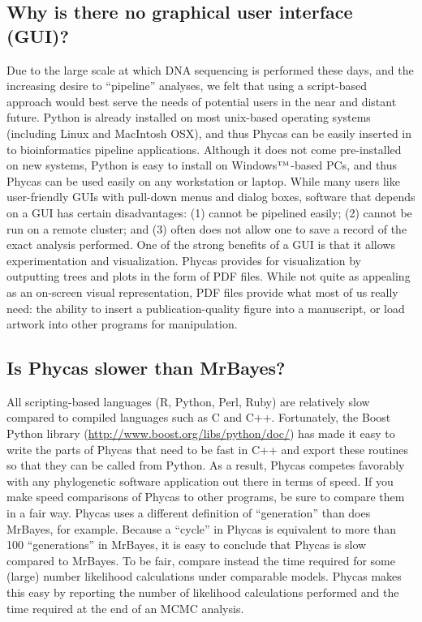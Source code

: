 \documentclass[10pt]{article}
\newcommand{\trademark}[1]{#1${}^{\mbox{\tiny TM}}$}
\begin{document}
\subsection{Why is there no graphical user interface (GUI)?}
Due to the large scale at which DNA sequencing is performed these days, and the increasing desire to ``pipeline'' analyses, we felt that using a script-based approach would best serve the needs of potential users in the near and distant future. Python is already installed on most unix-based operating systems (including Linux and MacIntosh OSX), and thus Phycas can be easily inserted in to bioinformatics pipeline applications. Although it does not come pre-installed on new systems, Python is easy to install on \trademark{Windows}-based PCs, and thus Phycas can be used easily on any workstation or laptop. While many users like user-friendly GUIs with pull-down menus and dialog boxes, software that depends on a GUI has certain disadvantages: (1) cannot be pipelined easily; (2) cannot be run on a remote cluster; and (3) often does not allow one to save a record of the exact analysis performed. One of the strong benefits of a GUI is that it allows experimentation and visualization. Phycas provides for visualization by outputting trees and plots in the form of PDF files. While not quite as appealing as an on-screen visual representation, PDF files provide what most of us really need: the ability to insert a publication-quality figure into a manuscript, or load artwork into other programs for manipulation.  

\subsection{Is Phycas slower than MrBayes?}
All scripting-based languages (R, Python, Perl, Ruby) are relatively slow compared to compiled languages such as C and C++. Fortunately, the Boost Python library (\url{http://www.boost.org/libs/python/doc/}) has made it easy to write the parts of Phycas that need to be fast in C++ and export these routines so that they can be called from Python. As a result, Phycas competes favorably with any phylogenetic software application out there in terms of speed. If you make speed comparisons of Phycas to other programs, be sure to compare them in a fair way. Phycas uses a different definition of ``generation'' than does MrBayes, for example. Because a ``cycle'' in Phycas is equivalent to more than 100 ``generations'' in MrBayes, it is easy to conclude that Phycas is slow compared to MrBayes. To be fair, compare instead the time required for some (large) number likelihood calculations under comparable models. Phycas makes this easy by reporting the number of likelihood calculations performed and the time required at the end of an MCMC analysis.
\end{document}
